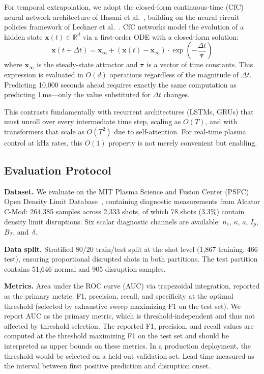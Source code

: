 \documentclass[twocolumn,prl,aps,superscriptaddress,floatfix]{revtex4-2}
\begin{document}
For temporal extrapolation, we adopt the closed-form continuous-time (CfC) neural network architecture of Hasani et al.~\cite{Hasani2022}, building on the neural circuit policies framework of Lechner et al.~\cite{Lechner2020}. CfC networks model the evolution of a hidden state $\mathbf{x}(t) \in \mathbb{R}^d$ via a first-order ODE with a closed-form solution:
\begin{equation}
\mathbf{x}(t + \Delta t) = \mathbf{x}_\infty + \left(\mathbf{x}(t) - \mathbf{x}_\infty\right) \cdot \exp\!\left(-\frac{\Delta t}{\boldsymbol{\tau}}\right)
\label{eq:cfc}
\end{equation}
where $\mathbf{x}_\infty$ is the steady-state attractor and $\boldsymbol{\tau}$ is a vector of time constants. This expression is evaluated in $O(d)$ operations regardless of the magnitude of $\Delta t$. Predicting 10,000 seconds ahead requires exactly the same computation as predicting 1\,ms---only the value substituted for $\Delta t$ changes.

This contrasts fundamentally with recurrent architectures (LSTMs, GRUs) that must unroll over every intermediate time step, scaling as $O(T)$, and with transformers that scale as $O(T^2)$ due to self-attention. For real-time plasma control at kHz rates, this $O(1)$ property is not merely convenient but enabling.

\subsection{Evaluation Protocol}

\textbf{Dataset.} We evaluate on the MIT Plasma Science and Fusion Center (PSFC) Open Density Limit Database~\cite{Greenwald2002}, containing diagnostic measurements from Alcator C-Mod: 264,385 samples across 2,333 shots, of which 78 shots (3.3\%) contain density limit disruptions. Six scalar diagnostic channels are available: $n_e$, $\kappa$, $a$, $I_p$, $B_T$, and~$\delta$.

\textbf{Data split.} Stratified 80/20 train/test split at the shot level (1,867 training, 466 test), ensuring proportional disrupted shots in both partitions. The test partition contains 51,646 normal and 905 disruption samples.

\textbf{Metrics.} Area under the ROC curve (AUC) via trapezoidal integration, reported as the primary metric. F1, precision, recall, and specificity at the optimal threshold (selected by exhaustive sweep maximizing F1 on the test set). We report AUC as the primary metric, which is threshold-independent and thus not affected by threshold selection. The reported F1, precision, and recall values are computed at the threshold maximizing F1 on the test set and should be interpreted as upper bounds on these metrics. In a production deployment, the threshold would be selected on a held-out validation set. Lead time measured as the interval between first positive prediction and disruption onset.
\end{document}

